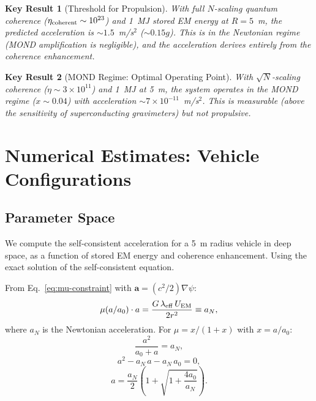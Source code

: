 \documentclass[aps,prd,twocolumn,superscriptaddress,nofootinbib]{revtex4-2}
\newcommand{\avec}{\mathbf{a}}
\newcommand{\ee}[1]{\times 10^{#1}}
\newcommand{\lam}{\lambda}
\newtheorem{result}{Key Result}
\begin{document}
\begin{result}[Threshold for Propulsion]
With full $N$-scaling quantum coherence ($\eta_{\rm coherent} \sim 10^{23}$)
and 1~MJ stored EM energy at $R = 5$~m, the predicted acceleration is
$\sim 1.5$~m/s$^2$ ($\sim 0.15g$).  This is in the Newtonian regime
(MOND amplification is negligible), and the acceleration derives entirely
from the coherence enhancement.
\end{result}

\begin{result}[MOND Regime: Optimal Operating Point]
With $\sqrt{N}$-scaling coherence ($\eta \sim 3\ee{11}$) and 1~MJ at
5~m, the system operates in the MOND regime ($x \sim 0.04$) with
acceleration $\sim 7\ee{-11}$~m/s$^2$.  This is measurable (above
the sensitivity of superconducting gravimeters) but not propulsive.
\end{result}


\section{Numerical Estimates: Vehicle Configurations}\label{sec:numerics}

\subsection{Parameter Space}

We compute the self-consistent acceleration for a 5~m radius vehicle
in deep space, as a function of stored EM energy and coherence
enhancement.  Using the exact solution of the self-consistent equation.

From Eq.~\eqref{eq:mu-constraint} with $\avec = (c^2/2)\nabla\psi$:
\begin{equation}
\mu(a/a_0)\cdot a = \frac{G\,\lam_{\rm eff}\,U_{\rm EM}}{2r^2}
\equiv a_N,
\end{equation}
where $a_N$ is the Newtonian acceleration.  For $\mu = x/(1+x)$
with $x = a/a_0$:
\begin{equation}
\frac{a^2}{a_0 + a} = a_N,
\end{equation}
\begin{equation}
a^2 - a_N\,a - a_N\,a_0 = 0,
\end{equation}
\begin{equation}\label{eq:a-exact}
a = \frac{a_N}{2}\left(1 + \sqrt{1 + \frac{4a_0}{a_N}}\right).
\end{equation}
\end{document}
